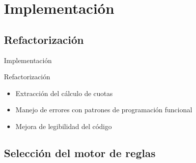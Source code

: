 \documentclass[10pt]{beamer}
\begin{document}
\section{Implementación}

\subsection{Refactorización}

\begin{frame}{Implementación}
    \begin{block}{Refactorización}
        \begin{itemize}
            \item Extracción del cálculo de cuotas
            \item Manejo de errores con patrones de programación funcional
            \item Mejora de legibilidad del código
        \end{itemize}
    \end{block}
\end{frame}

\subsection{Selección del motor de reglas}
\end{document}
